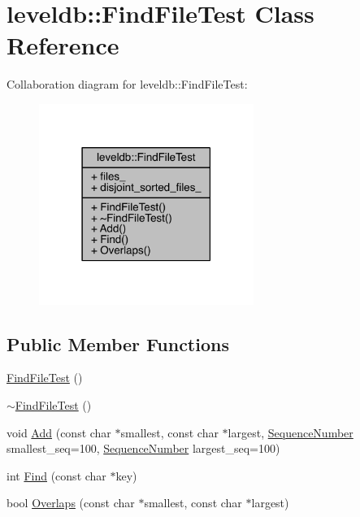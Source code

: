 \hypertarget{classleveldb_1_1_find_file_test}{}\section{leveldb\+:\+:Find\+File\+Test Class Reference}
\label{classleveldb_1_1_find_file_test}


Collaboration diagram for leveldb\+:\+:Find\+File\+Test\+:\nopagebreak
\begin{figure}[H]
\begin{center}
\leavevmode
\includegraphics[width=198pt]{classleveldb_1_1_find_file_test__coll__graph}
\end{center}
\end{figure}
\subsection*{Public Member Functions}
\begin{DoxyCompactItemize}
\item 
\hyperlink{classleveldb_1_1_find_file_test_a79d3a7171588c32598d46610563709e8}{Find\+File\+Test} ()
\item 
\hyperlink{classleveldb_1_1_find_file_test_a147a326f046217d4a6cf737d3346bde7}{$\sim$\+Find\+File\+Test} ()
\item 
void \hyperlink{classleveldb_1_1_find_file_test_a7daf932b5d9881438c6edb5f7881901c}{Add} (const char $\ast$smallest, const char $\ast$largest, \hyperlink{namespaceleveldb_a5481ededd221c36d652c371249f869fa}{Sequence\+Number} smallest\+\_\+seq=100, \hyperlink{namespaceleveldb_a5481ededd221c36d652c371249f869fa}{Sequence\+Number} largest\+\_\+seq=100)
\item 
int \hyperlink{classleveldb_1_1_find_file_test_a233fd8c1e1764f2572e03d28b1f58ae0}{Find} (const char $\ast$key)
\item 
bool \hyperlink{classleveldb_1_1_find_file_test_a617e51dc2e6acbe7d5bc6d0a7224ac51}{Overlaps} (const char $\ast$smallest, const char $\ast$largest)
\end{DoxyCompactItemize}
